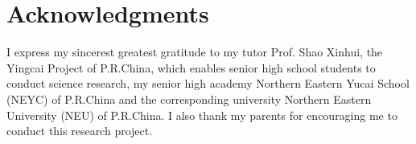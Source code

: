 \documentclass{article}
\begin{document}
\section*{Acknowledgments}
I express my sincerest greatest gratitude to my tutor Prof. Shao Xinhui, the Yingcai Project of P.R.China, which enables senior high school students to conduct science research, my senior high academy Northern Eastern Yucai School (NEYC) of P.R.China and the corresponding university Northern Eastern University (NEU) of P.R.China. I also thank my parents for encouraging me to conduct this research project.



\end{document}
